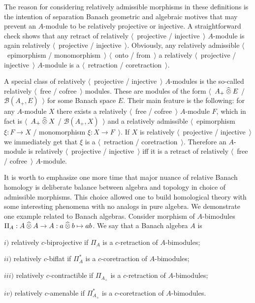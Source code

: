 The reason for considering relatively admissible morphisms in these definitions is the intention of separation Banach geometric and algebraic motives that may prevent an $A$-module to be relatively projective or injective. A straightforward check shows that any retract of relatively $\langle$~projective / injective~$\rangle$ $A$-module is again relatively $\langle$~projective / injective~$\rangle$. Obviously, any relatively admissible $\langle$~epimorphism / monomorphism~$\rangle$ $\langle$~onto / from~$\rangle$ a relatively $\langle$~projective / injective~$\rangle$ $A$-module is a $\langle$~retraction / coretraction~$\rangle$.

A special class of relatively $\langle$~projective / injective~$\rangle$ $A$-modules is the so-called relatively $\langle$~free / cofree~$\rangle$ modules. These are modules of the form $\langle$~$A_+\mathbin{\widehat{\otimes}} E$ / $\mathcal{B}(A_+,E)$~$\rangle$ for some Banach space $E$. Their main feature is the following: for any $A$-module $X$ there exists a relatively $\langle$~free / cofree~$\rangle$ $A$-module $F$, which in fact is $\langle$~$A_+\mathbin{\widehat{\otimes}} X$ / $\mathcal{B}(A_+,X)$~$\rangle$ and a relatively admissible $\langle$~epimorphism $\xi:F\to X$ / monomorphism $\xi:X\to F$~$\rangle$. If $X$ is relatively $\langle$~projective / injective~$\rangle$ we immediately get that $\xi$ is a $\langle$~retraction / coretraction~$\rangle$. Therefore an $A$-module is relatively $\langle$~projective / injective~$\rangle$ iff it is a retract of relatively $\langle$~free / cofree~$\rangle$ $A$-module. 

It is worth to emphasize one more time that major nuance of relative Banach homology is deliberate balance between algebra and topology in choice of admissible morphisms. This choice allowed one to build homological theory with some interesting phenomena with no analogs in pure algebra. We demonstrate one example related to Banach algebras. Consider morphism of $A$-bimodules  $\Pi_A:A\mathbin{\widehat{\otimes}} A\to A:a\mathbin{\widehat{\otimes}} b\mapsto ab$. We say that a Banach algebra $A$ is 

$i)$ relatively $c$-biprojective if $\Pi_A$ is a $c$-retraction of $A$-bimodules;

$ii)$ relatively $c$-biflat if $\Pi_A^*$ is a $c$-coretraction of $A$-bimodules;

$iii)$ relatively $c$-contractible if $\Pi_{A_+}$ is a $c$-retraction of $A$-bimodules;

$iv)$ relatively $c$-amenable if $\Pi_{A_+}^*$ is a $c$-coretraction of $A$-bimodules.


